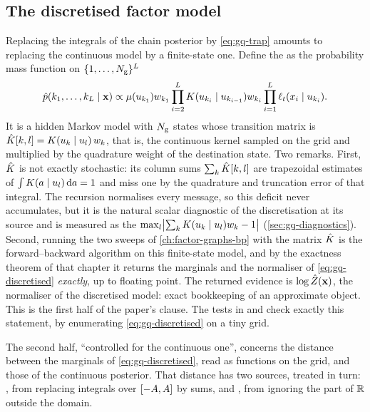 \subsection{The discretised factor model}

Replacing the integrals of the chain posterior by \cref{eq:gq-trap} amounts to
replacing the continuous model by a finite-state one. Define the
 as the probability mass function on
$\{1,\dots,N_{\mathrm{g}}\}^{L}$
\begin{equation}
  \hat p(k_1,\dots,k_L\mid\mathbf{x})\propto
  \mu(u_{k_1})w_{k_1}\prod_{i=2}^{L}K(u_{k_i}\mid u_{k_{i-1}})w_{k_i}
  \prod_{i=1}^{L}\ell_t(x_i\mid u_{k_i}).
  \label{eq:gq-discretised}
\end{equation}
It is a hidden Markov model with $N_{\mathrm{g}}$ states whose transition matrix is
$\hat{K}[k,l]=K(u_{k}\mid u_{l})\,w_k$, that is, the continuous
kernel sampled on the grid and multiplied by the quadrature weight of the destination
state. Two remarks. First, $\hat{K}$ is not exactly stochastic: its column sums
$\sum_k\hat{K}[k,l]$ are trapezoidal estimates of $\int K(a\mid u_{l})\,\mathrm{d} a=1$
and miss one by the quadrature and truncation error of that integral. The recursion
normalises every message, so this deficit never accumulates, but it is the natural
scalar diagnostic of the discretisation at its source and is measured as the
 $\max_l\bigl|\sum_kK(u_{k}\mid u_{l})w_k-1\bigr|$
(\cref{sec:gq-diagnostics}). Second, running the two sweeps of \cref{ch:factor-graphs-bp}
with the matrix $\hat{K}$ is the forward--backward algorithm on this finite-state
model, and by the exactness theorem of that chapter it returns the marginals and the
normaliser of \cref{eq:gq-discretised} \emph{exactly}, up to floating point. The
returned evidence is $\log\hat Z(\mathbf{x})$, the normaliser of the discretised model: exact
bookkeeping of an approximate object. This is the first half of the paper's clause.
The tests  in
 and  check exactly
this statement, by enumerating \cref{eq:gq-discretised} on a tiny grid.

The second half, ``controlled for the continuous one'', concerns the distance between
the marginals of \cref{eq:gq-discretised}, read as functions on the grid, and those of
the continuous posterior. That distance has two sources, treated in turn:
, from replacing integrals over $[-A,A]$ by
sums, and , from ignoring the part of $\mathbb{R}$ outside the
domain.

